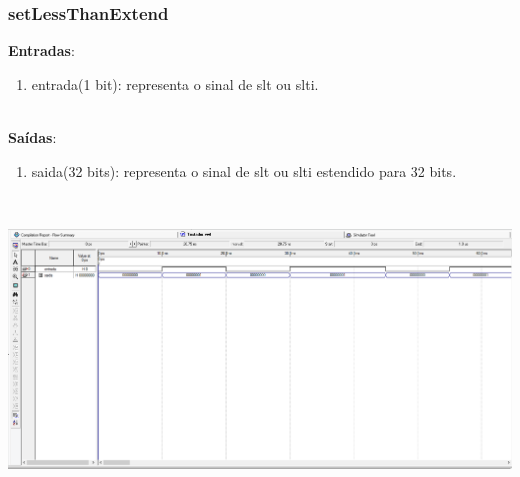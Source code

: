 \documentclass{article}
\begin{document}
    \subsubsection{setLessThanExtend}
    \textbf{Entradas}:
   \begin{enumerate}
        \item entrada(1 bit): representa o sinal de slt ou slti.\\
    \end{enumerate}
    \\
    \textbf{Saídas}:
    \begin{enumerate}
        \item saida(32 bits): representa o sinal de slt ou slti estendido para 32 bits.\\
    \end{enumerate}\\
    \begin{center}
        \includegraphics[scale=0.4]{setLessThanExtend.PNG}
    \end{center}

    
    \newpage
\end{document}
